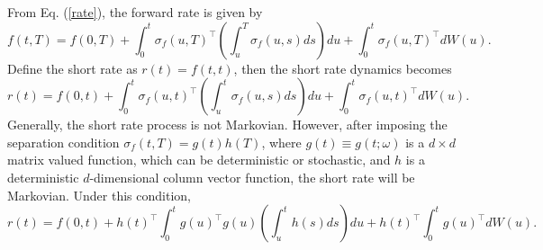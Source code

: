 \documentclass[12pt]{article}
\begin{document}
  From Eq. (\ref{rate}), the forward rate is given by
  \begin{equation}
    f(t,T)=f(0,T)+\int_0^t\sigma_f(u,T)^{\top}\left(\int_u^T\sigma_f(u,s)ds\right)du+\int_0^t\sigma_f(u,T)^{\top}dW(u).
  \end{equation}
  Define the short rate as $r(t)=f(t,t)$, then the short rate dynamics becomes
  \begin{equation}
    r(t)=f(0,t)+\int_0^t\sigma_f(u,t)^{\top}\left(\int_u^t\sigma_f(u,s)ds\right)du+\int_0^t\sigma_f(u,t)^{\top}dW(u).
  \end{equation}
  Generally, the short rate process is not Markovian. However, after imposing the separation condition
  $\sigma_f(t,T)=g(t)h(T)$, where $g(t)\equiv g(t;\omega)$ is a $d\times d$ matrix valued function, which can
  be deterministic or stochastic, and $h$ is a
  deterministic $d$-dimensional column vector function, the short rate will be Markovian. Under this condition,
  \begin{equation}
    r(t)=f(0,t)+h(t)^{\top}\int_0^tg(u)^{\top}g(u)\left(\int_u^th(s)ds\right)du+h(t)^{\top}\int_0^tg(u)^{\top}dW(u).
  \end{equation}
\end{document}
